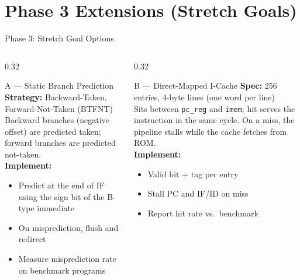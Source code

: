 \documentclass[aspectratio=169,10pt]{beamer}
\begin{document}
\section{Phase 3 Extensions (Stretch Goals)}

\begin{frame}{Phase 3: Stretch Goal Options}
  \begin{columns}[T]
    \begin{column}{0.32\textwidth}
      \begin{block}{A --- Static Branch Prediction}
        \textbf{Strategy:} Backward-Taken, Forward-Not-Taken (BTFNT)\\[0.4em]
        Backward branches (negative offset) are predicted taken; forward branches are predicted not-taken.\\[0.4em]
        \textbf{Implement:}
        \begin{itemize}\scriptsize
          \item Predict at the end of IF using the sign bit of the B-type immediate
          \item On misprediction, flush and redirect
          \item Measure misprediction rate on benchmark programs
        \end{itemize}
      \end{block}
    \end{column}
    \begin{column}{0.32\textwidth}
      \begin{block}{B --- Direct-Mapped I-Cache}
        \textbf{Spec:} 256 entries, 4-byte lines (one word per line)\\[0.4em]
        Sits between \texttt{pc\_reg} and \texttt{imem}; hit serves the instruction in the same cycle. On a miss, the pipeline stalls while the cache fetches from ROM.\\[0.4em]
        \textbf{Implement:}
        \begin{itemize}\scriptsize
          \item Valid bit + tag per entry
          \item Stall PC and IF/ID on miss
          \item Report hit rate vs.\ benchmark
        \end{itemize}
      \end{block}
    \end{column}

\end{columns}
\end{frame}
\end{document}
